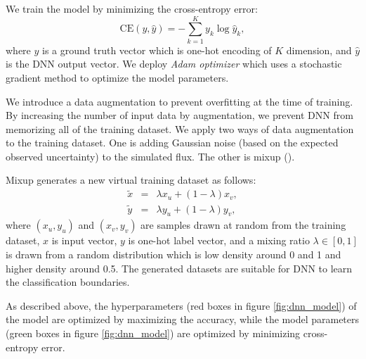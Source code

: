 \documentclass[useamsfonts]{pasj01}
\begin{document}
We train the model by minimizing the cross-entropy error: 
\begin{equation}
\mathrm{CE} \left(y, \hat{y} \right) =　-\sum_{k = 1}^K y_k \log \hat{y}_k,
\end{equation}
where $y$ is a ground truth vector which is one-hot encoding of $K$ dimension, and $\hat{y}$ is the DNN output vector.
We deploy {\it Adam optimizer} which uses a stochastic gradient method to optimize the model parameters.

We introduce a data augmentation to prevent overfitting at the time of training.
By increasing the number of input data by augmentation, we prevent DNN from memorizing all of the training dataset.
We apply two ways of data augmentation to the training dataset.
One is adding Gaussian noise (based on the expected observed uncertainty) to the simulated flux.
The other is mixup (\cite{mixup}).

Mixup generates a new virtual training dataset as follows:
\begin{eqnarray*}
    \tilde{x} &=& \lambda x_u + \left( 1-\lambda \right) x_v, \\
    \tilde{y} &=& \lambda y_u + \left( 1-\lambda \right) y_v,
\end{eqnarray*}
where $\left(x_u, y_u\right)$ and $\left(x_v, y_v\right)$ are samples drawn at random from the training dataset, $x$ is input vector, $y$ is one-hot label vector, 
and a mixing ratio $\lambda \in \left[0, 1\right]$ is drawn from a random distribution which is low density around 0 and 1 and higher density around 0.5. 
The generated datasets are suitable for DNN to learn the classification boundaries.

As described above, the hyperparameters (red boxes in figure \ref{fig:dnn_model}) of the model are optimized by maximizing the accuracy, while 
the model parameters (green boxes in figure \ref{fig:dnn_model}) are optimized by minimizing cross-entropy error.
%
%
\end{document}
